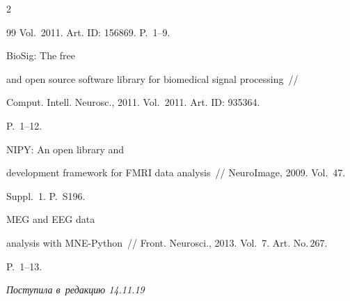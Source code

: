 \begin{multicols}{2}
{{\begin{thebibliography}{99}
Vol.~2011. Art. ID: 156869. P.~1--9.




   BioSig: The free 


and open source software library for biomedical signal processing~// 


Comput. Intell. Neurosc., 2011. Vol.~2011. Art. ID: 935364. 


P.~1--12.




   NIPY: An open library and 


development framework for FMRI data analysis~// NeuroImage, 2009. Vol.~47. 


Suppl.~1. P.~S196.




    MEG and EEG data 


analysis with MNE-Python~// Front. Neurosci., 2013. Vol.~7. Art. No.\,267.  


P.~1--13.


 \end{thebibliography}





 }


 }





\end{multicols}





\vspace*{-3pt}





\hfill{\small\textit{Поступила в~редакцию 14.11.19}}















\newpage





\vspace*{-28pt}





